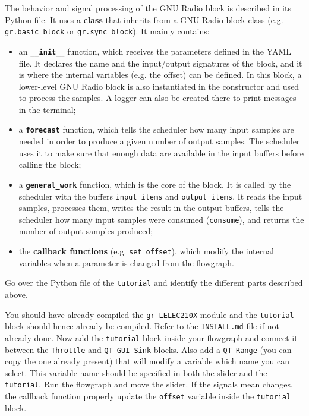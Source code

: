 The behavior and signal processing of the GNU Radio block is described in its Python file. It uses a \textbf{class} that inherits from a GNU Radio block class (e.g. \texttt{gr.basic\_block} or \texttt{gr.sync\_block}). It mainly contains:
\begin{itemize}
    \item an \textbf{\texttt{\_\_init\_\_}} function, which receives the parameters defined in the YAML file. It declares the name and the input/output signatures of the block, and it is where the internal variables (e.g. the offset) can be defined. In this block, a lower-level GNU Radio block is also instantiated in the constructor and used to process the samples. A logger can also be created there to print messages in the terminal;
    \item a \textbf{\texttt{forecast}} function, which tells the scheduler how many input samples are needed in order to produce a given number of output samples. The scheduler uses it to make sure that enough data are available in the input buffers before calling the block;
    \item a \textbf{\texttt{general\_work}} function, which is the core of the block. It is called by the scheduler with the buffers \texttt{input\_items} and \texttt{output\_items}. It reads the input samples, processes them, writes the result in the output buffers, tells the scheduler how many input samples were consumed (\texttt{consume}), and returns the number of output samples produced;
    \item the \textbf{callback functions} (e.g. \texttt{set\_offset}), which modify the internal variables when a parameter is changed from the flowgraph.
\end{itemize}

Go over the Python file of the \texttt{tutorial} and identify the different parts described above.

You should have already compiled the \texttt{gr-LELEC210X} module and the \texttt{tutorial} block should hence already be compiled. Refer to the \texttt{INSTALL.md} file if not already done. Now add the \texttt{tutorial} block inside your flowgraph and connect it between the \texttt{Throttle} and \texttt{QT GUI Sink} blocks. Also add a \texttt{QT Range} (you can copy the one already present) that will modify a variable which name you can select. This variable name should be specified in both the slider and the \texttt{tutorial}. Run the flowgraph and move the slider. If the signals mean changes, the callback function properly update the \texttt{offset} variable inside the \texttt{tutorial} block.

